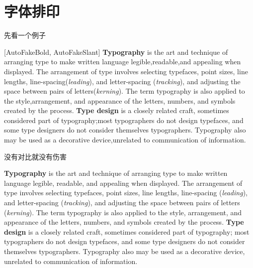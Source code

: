 \section{字体排印}

\begin{frame}{先看一个例子}
\begin{minipage}{\textwidth}
  [AutoFakeBold, AutoFakeSlant]\small
  \linespread{0.85}\selectfont
  \textbf{Typography} is the art and technique of arranging type to make written language
  legible,readable,and appealing when displayed. The arrangement of type involves selecting
  typefaces, point sizes, line lengths, line-spacing(\textit{leading}), and letter-spacing
  (\textit{tracking}), and adjusting the space between pairs of letters(\textit{kerning}).
  The term typography is also applied to the style,arrangement, and appearance of the letters,
  numbers, and symbols created by the process. \textbf{Type design} is a closely related craft,
  sometimes considered part of typography;most typographers do not design typefaces, and some
  type designers do not consider themselves typographers. Typography also may be used as a
  decorative device,unrelated to communication of information.
\end{minipage}
\let\thefootnote\relax
{}
\end{frame}

\begin{frame}{没有对比就没有伤害}
\begin{minipage}{\textwidth}
  \small
  \textbf{Typography} is the art and technique of arranging type to make written language
  legible, readable, and appealing when displayed. The arrangement of type involves selecting
  typefaces, point sizes, line lengths, line-spacing (\textit{leading}), and letter-spacing
  (\textit{tracking}), and adjusting the space between pairs of letters (\textit{kerning}).
  The term typography is also applied to the style, arrangement, and appearance of the letters,
  numbers, and symbols created by the process. \textbf{Type design} is a closely related craft,
  sometimes considered part of typography; most typographers do not design typefaces, and some
  type designers do not consider themselves typographers. Typography also may be used as a
  decorative device, unrelated to communication of information.
\end{minipage}
\let\thefootnote\relax
{}
\end{frame}

